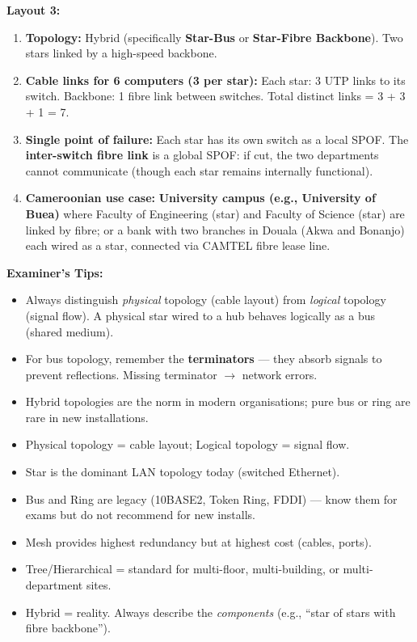 \documentclass[11pt]{article}
\newcommand{\cle}[1]{{\popxbold\color{popdark}#1}}
\begin{document}
\begin{exoresolu}
\textbf{Layout 3:}
\begin{enumerate}
\item \textbf{Topology:} \cle{Hybrid} (specifically \textbf{Star-Bus} or \textbf{Star-Fibre Backbone}). Two stars linked by a high-speed backbone.
\item \textbf{Cable links for 6 computers (3 per star):} Each star: 3 UTP links to its switch. Backbone: 1 fibre link between switches. Total distinct links = 3 + 3 + 1 = 7.
\item \textbf{Single point of failure:} Each star has its own switch as a local SPOF. The \textbf{inter-switch fibre link} is a global SPOF: if cut, the two departments cannot communicate (though each star remains internally functional).
\item \textbf{Cameroonian use case:} \textbf{University campus (e.g., University of Buea)} where Faculty of Engineering (star) and Faculty of Science (star) are linked by fibre; or a bank with two branches in Douala (Akwa and Bonanjo) each wired as a star, connected via CAMTEL fibre lease line.
\end{enumerate}

\textbf{Examiner's Tips:}
\begin{itemize}
\item Always distinguish \emph{physical} topology (cable layout) from \emph{logical} topology (signal flow). A physical star wired to a hub behaves logically as a bus (shared medium).
\item For bus topology, remember the \textbf{terminators} — they absorb signals to prevent reflections. Missing terminator $\rightarrow$ network errors.
\item Hybrid topologies are the norm in modern organisations; pure bus or ring are rare in new installations.
\end{itemize}
\end{exoresolu}

\begin{aretenir}
\begin{itemize}
\item Physical topology = cable layout; Logical topology = signal flow.
\item Star is the dominant LAN topology today (switched Ethernet).
\item Bus and Ring are legacy (10BASE2, Token Ring, FDDI) — know them for exams but do not recommend for new installs.
\item Mesh provides highest redundancy but at highest cost (cables, ports).
\item Tree/Hierarchical = standard for multi-floor, multi-building, or multi-department sites.
\item Hybrid = reality. Always describe the \emph{components} (e.g., ``star of stars with fibre backbone'').
\end{itemize}
\end{aretenir}
\end{document}
